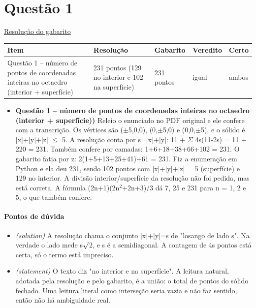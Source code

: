 \documentclass{article}%
\begin{document}
\section*{Questão 1}%
\href{https://poliedroresolve.sistemapoliedro.com.br/vestibulares/ita/2026/ita-2-fase-dia-1-28-10-2025-2-fase-dia-1/dissertativa-1-matematica-2-fase-dia-1-ita-2026}{Resolução do gabarito}\par\smallskip%
\begin{longtable}{@{}p{} p{} p{} p{} p{}@{}}\toprule Item & Resolução & Gabarito & Veredito & Certo \\ \midrule
Questão 1 -- número de pontos de coordenadas inteiras no octaedro (interior + superfície) & 231 pontos (129 no interior e 102 na superfície) & 231 pontos & igual & ambos \\
\bottomrule\end{longtable}%
\begin{itemize}%
\item%
\textbf{Questão 1 -- número de pontos de coordenadas inteiras no octaedro (interior + superfície))} Releio o enunciado no PDF original e ele confere com a transcrição. Os vértices são ($\pm$5,0,0), (0,$\pm$5,0) e (0,0,$\pm$5), e o sólido é |x|+|y|+|z| $\leq$ 5. A resolução conta por s=|x|+|y|: 11 + $\Sigma$ 4s(11-2s) = 11 + 220 = 231. Também confere por camadas: 1+6+18+38+66+102 = 231. O gabarito fatia por z: 2(1+5+13+25+41)+61 = 231. Fiz a enumeração em Python e ela deu 231, sendo 102 pontos com |x|+|y|+|z| = 5 (superfície) e 129 no interior. A divisão interior/superfície da resolução não foi pedida, mas está correta. A fórmula (2n+1)(2n$^2$+2n+3)/3 dá 7, 25 e 231 para n = 1, 2 e 5, o que também confere.%
\end{itemize}%
\paragraph{Pontos de dúvida}%
\begin{itemize}%
\item%
\textit{(solution)} A resolução chama o conjunto |x|+|y|=s de "losango de lado s". Na verdade o lado mede s$\surd$2, e s é a semidiagonal. A contagem de 4s pontos está certa, só o termo está impreciso.%
\item%
\textit{(statement)} O texto diz "no interior e na superfície". A leitura natural, adotada pela resolução e pelo gabarito, é a união: o total de pontos do sólido fechado. Uma leitura literal como interseção seria vazia e não faz sentido, então não há ambiguidade real.%
\end{itemize}%
\end{document}
